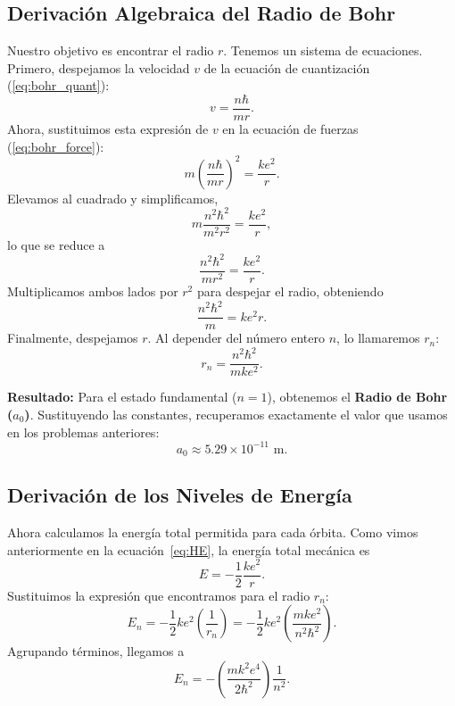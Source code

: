 \documentclass[11pt,a4paper]{book}
\begin{document}
\subsection{Derivación Algebraica del Radio de Bohr}

Nuestro objetivo es encontrar el radio $r$. Tenemos un sistema de ecuaciones.
Primero, despejamos la velocidad $v$ de la ecuación de cuantización (\ref{eq:bohr_quant}):
\begin{equation}
    v = \frac{n \hbar}{m r}.
\end{equation}
Ahora, sustituimos esta expresión de $v$ en la ecuación de fuerzas (\ref{eq:bohr_force}):
\begin{equation}
    m \left( \frac{n \hbar}{m r} \right)^2 = \frac{k e^2}{r}.
\end{equation}
Elevamos al cuadrado y simplificamos,
\begin{equation}
    m \frac{n^2 \hbar^2}{m^2 r^2} = \frac{k e^2}{r},
\end{equation}
lo que se reduce a
\begin{equation}
    \frac{n^2 \hbar^2}{m r^2} = \frac{k e^2}{r}.
\end{equation}
Multiplicamos ambos lados por $r^2$ para despejar el radio, obteniendo
\begin{equation}
    \frac{n^2 \hbar^2}{m} = k e^2 r.
\end{equation}
Finalmente, despejamos $r$. Al depender del número entero $n$, lo llamaremos $r_n$:
\begin{equation}
    r_n = \frac{n^2 \hbar^2}{m k e^2}.
\end{equation}

\textbf{Resultado:} Para el estado fundamental ($n=1$), obtenemos el \textbf{Radio de Bohr ($a_0$)}. Sustituyendo las constantes, recuperamos exactamente el valor que usamos en los problemas anteriores:
\begin{equation}
    a_0 \approx 5.29 \times 10^{-11} \text{ m}.
\end{equation}

\subsection{Derivación de los Niveles de Energía}

Ahora calculamos la energía total permitida para cada órbita.
Como vimos anteriormente en la ecuación~\eqref{eq:HE}, la energía total mecánica es
\begin{equation}
    E = -\frac{1}{2} \frac{k e^2}{r}.
\end{equation}
Sustituimos la expresión que encontramos para el radio $r_n$:
\begin{equation}
    E_n = -\frac{1}{2} k e^2 \left( \frac{1}{r_n} \right) = -\frac{1}{2} k e^2 \left( \frac{m k e^2}{n^2 \hbar^2} \right).
\end{equation}
Agrupando términos, llegamos a
\begin{equation}
    E_n = - \left( \frac{m k^2 e^4}{2 \hbar^2} \right) \frac{1}{n^2}.
\end{equation}
\end{document}
